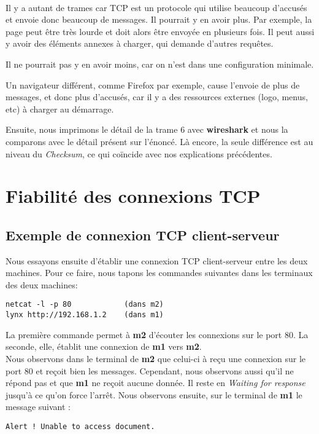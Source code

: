 \documentclass{article}
\begin{document}
\paragraph{}{
Il y a autant de trames car TCP est un protocole qui utilise beaucoup d'accusés et envoie donc beaucoup de messages. Il pourrait y en avoir plus. Par exemple, la page peut être très lourde et doit alors être envoyée en plusieurs fois. Il peut aussi y avoir des éléments annexes à charger, qui demande d'autres requêtes.

Il ne pourrait pas y en avoir moins, car on n'est dans une configuration minimale.

Un navigateur différent, comme Firefox par exemple, cause l'envoie de plus de messages, et donc plus d'accusés, car il y a des ressources externes (logo, menus, etc) à charger au démarrage.
} \newpage

Ensuite, nous imprimons le détail de la trame 6 avec \textbf{wireshark} et nous la comparons avec le détail présent sur l'énoncé. Là encore, la seule différence est au niveau du \textit{Checksum}, ce qui coïncide avec nos explications précédentes.

\section{Fiabilité des connexions TCP}

\subsection{Exemple de connexion TCP client-serveur}

Nous essayons ensuite d'établir une connexion TCP client-serveur entre les deux machines. Pour ce faire, nous tapons les commandes suivantes dans les terminaux des deux machines:
\begin{verbatim}
netcat -l -p 80            (dans m2)
lynx http://192.168.1.2    (dans m1)
\end{verbatim}

La première commande permet à \textbf{m2} d'écouter les connexions sur le port 80. La seconde, elle, établit une connexion de \textbf{m1} vers \textbf{m2}. \\

Nous observons dans le terminal de \textbf{m2} que celui-ci à reçu une connexion sur le port 80 et reçoit bien les messages. Cependant, nous observons aussi qu'il ne répond pas et que \textbf{m1} ne reçoit aucune donnée. Il reste en \textit{Waiting for response} jusqu'à ce qu'on force l'arrêt. Nous observons ensuite, sur le terminal de \textbf{m1} le message suivant :
\begin{verbatim}
Alert ! Unable to access document.
\end{verbatim}
\end{document}
